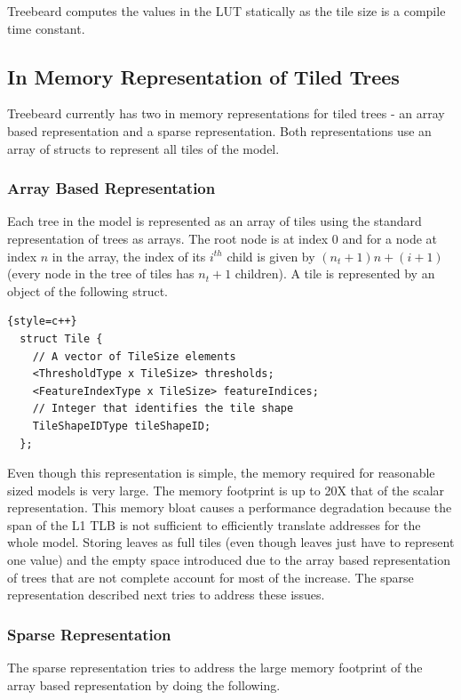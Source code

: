 Treebeard computes the values in the LUT statically as the tile size is a compile time constant.

\subsection{In Memory Representation of Tiled Trees}
Treebeard currently has two in memory representations for tiled trees - an array based representation and a sparse representation. Both representations use an array of structs to represent all tiles of the model. 

\subsubsection{Array Based Representation}
\label{sec:ArrayBased}
Each tree in the model is represented as an array of tiles using the standard representation of trees as arrays. The root node is at index 0 and for a node at index $n$ in the array, the index of its $i^{th}$ child is given by $(n_t + 1) n + (i + 1)$ (every node in the tree of tiles has $n_t + 1$ children). A tile is represented by an object of the following struct.
\begin{lstlisting}{style=c++}
  struct Tile {
    // A vector of TileSize elements
    <ThresholdType x TileSize> thresholds; 
    <FeatureIndexType x TileSize> featureIndices;
    // Integer that identifies the tile shape
    TileShapeIDType tileShapeID; 
  };  
\end{lstlisting}
Even though this representation is simple, the memory required for reasonable sized models is very large. The memory footprint is up to 20X that of the scalar representation. This memory bloat causes a performance degradation because the span of the L1 TLB is not sufficient to efficiently translate addresses for the whole model.  Storing leaves as full tiles (even though leaves just have to represent one value) and the empty space introduced due to the array based representation of trees that are not complete account for most of the increase. The sparse representation described next tries to address these issues. 

\subsubsection{Sparse Representation}
\label{sec:SparseRep}
The sparse representation tries to address the large memory footprint of the array based representation by doing the following.

